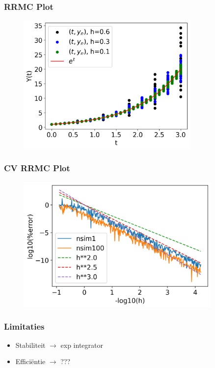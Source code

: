 \documentclass[20pt]{beamer}
\begin{document}
\begin{frame}
    \frametitle{RRMC Plot}
    \begin{figure}[h]
        \centering
        \includegraphics[width=0.8\textwidth]{imgs/RRMC IVP.png}
    \end{figure}
\end{frame}

\begin{frame}
    \frametitle{CV RRMC Plot}
    \begin{figure}[h]
        \centering
        \includegraphics[width=0.9\textwidth]{imgs/CV RRMC IVP.png}
    \end{figure}
\end{frame}

\begin{frame}
    \frametitle{Limitaties}
    \begin{itemize}
        \item Stabiliteit $\rightarrow$ exp integrator
        \item Efficiëntie $\rightarrow$ ???
    \end{itemize}
\end{frame}

\end{document}
